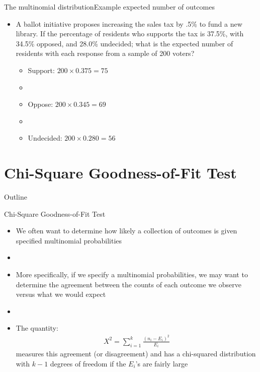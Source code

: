 \documentclass[xcolor=dvipsnames]{beamer}
\begin{document}
\begin{frame}{The multinomial distribution}{Example expected number of outcomes}
	\begin{itemize}
		\item A ballot initiative proposes increasing the sales tax by .5\% to fund a new library. If the percentage of residents who supports the tax is 37.5\%, with 34.5\% opposed, and 28.0\% undecided; what is the expected number of residents with each response from a sample of 200 voters? \pause
		\begin{itemize}
			\item Support: $200 \times 0.375 = 75$ \pause
			\item[]
			\item Oppose: $200 \times 0.345 = 69$ \pause
			\item[]
			\item Undecided: $200 \times 0.280 = 56$
		\end{itemize}
	\end{itemize}
\end{frame}

\section{Chi-Square Goodness-of-Fit Test}
\begin{frame}{Outline}
\tableofcontents[currentsection,subsectionstyle=show/shaded/hide]
\end{frame}

\begin{frame}{Chi-Square Goodness-of-Fit Test}
	\begin{itemize}
		\item We often want to determine how likely a collection of outcomes is given specified multinomial probabilities \pause
		\item[]
		\item More specifically, if we specify a multinomial probabilities, we may want to determine the agreement between the counts of each outcome we observe versus what we would expect \pause
		\item[]
		\item The quantity:
		\begin{gather*}
			X^2 = \sum_{i=1}^k \frac{(n_i-E_i)^2}{E_i}
		\end{gather*}
		measures this agreement (or disagreement) and has a chi-squared distribution with $k-1$ degrees of freedom if the $E_i$'s are fairly large
	\end{itemize}
\end{frame}
\end{document}
